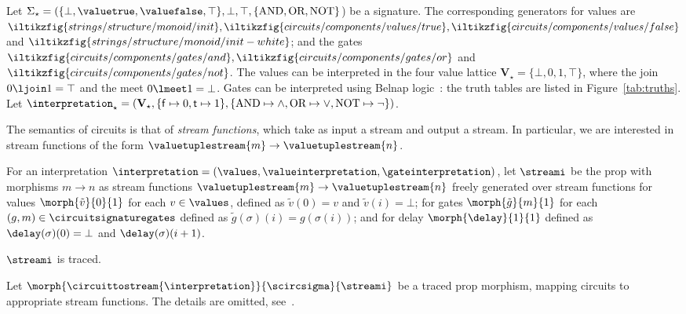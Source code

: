 \documentclass[10pt]{article}
\begin{document}
    \begin{example}\label{ex:interp}
        Let \(\Sigma_\star = (\{\bot,\valuetrue,\valuefalse,\top\}, \bot, \top, \{\text{AND},\text{OR},\text{NOT}\}\)) be a signature.
        The corresponding generators for values are \(\iltikzfig{strings/structure/monoid/init}, \iltikzfig{circuits/components/values/true}, \iltikzfig{circuits/components/values/false}\) and \(\iltikzfig{strings/structure/monoid/init-white}\); and the gates \(\iltikzfig{circuits/components/gates/and}, \iltikzfig{circuits/components/gates/or}\) and \(\iltikzfig{circuits/components/gates/not}\).
        The values can be interpreted in the four value lattice \(\mathbf{V}_\star = \{\bot, 0, 1, \top\}\), where the join \(0 \ljoin 1 = \top\) and the meet \(0 \lmeet 1 = \bot\).
        Gates can be interpreted using Belnap logic~\cite{belnap1977useful}: the truth tables are listed in Figure~\ref{tab:truths}.
        Let \(\interpretation_\star = (\mathbf{V}_\star, \{\mathsf{f} \mapsto 0, \mathsf{t} \mapsto 1\}, \{\text{AND} \mapsto \land, \text{OR} \mapsto \lor, \text{NOT} \mapsto \neg\})\).
    \end{example}

    \noindent
    The semantics of circuits is that of \emph{stream functions}, which take as input a stream and output a stream.
    In particular, we are interested in stream functions of the form \(\valuetuplestream{m} \to \valuetuplestream{n}\).

    \begin{definition}
        For an interpretation \(\interpretation = (\values, \valueinterpretation, \gateinterpretation)\), let \(\streami\) be the prop with morphisms \(m \to n\) as stream functions \(\valuetuplestream{m} \to \valuetuplestream{n}\) freely generated over
        stream functions for values \(\morph{\tilde{v}}{0}{1}\) for each \(v \in \values\), defined as \(\tilde{v}(0) = v\) and \(\tilde{v}(i) = \bot\); for gates \(\morph{\tilde{g}}{m}{1}\) for each \((g,m) \in \circuitsignaturegates\) defined as \(\tilde{g}(\sigma)(i) = g(\sigma(i))\); and for delay \(\morph{\delay}{1}{1}\) defined as \(\delay(\sigma)(0) = \bot\) and \(\delay(\sigma)(i+1)\).
    \end{definition}

    \begin{theorem}
        \(\streami\) is traced.
    \end{theorem}

    \begin{definition}\label{def:circuittostreams}
        Let \(\morph{\circuittostream{\interpretation}}{\scircsigma}{\streami}\) be a traced prop morphism, mapping circuits to appropriate stream functions.
        The details are omitted, see~\cite{ghica2022full}.
    \end{definition}
\end{document}
